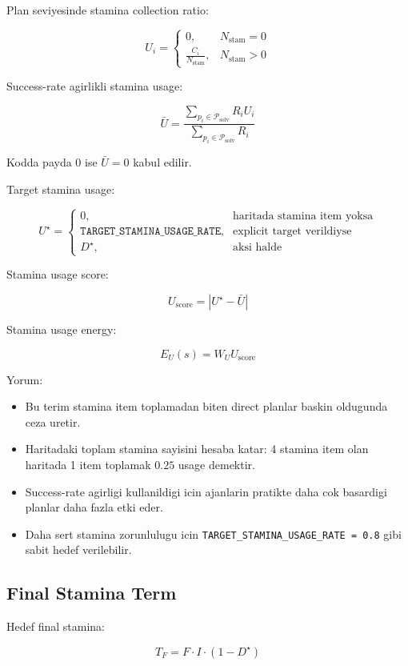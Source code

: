 \documentclass[11pt]{article}
\begin{document}
Plan seviyesinde stamina collection ratio:

\[
U_i
=
\begin{cases}
0, & N_{\text{stam}} = 0 \\
\frac{C_i}{N_{\text{stam}}}, & N_{\text{stam}} > 0
\end{cases}
\]

Success-rate agirlikli stamina usage:

\[
\bar{U}
=
\frac{
  \sum_{p_i \in \mathcal{P}_{\text{solv}}}
  R_i U_i
}{
  \sum_{p_i \in \mathcal{P}_{\text{solv}}}
  R_i
}
\]

Kodda payda $0$ ise $\bar{U}=0$ kabul edilir.

Target stamina usage:

\[
U^\star
=
\begin{cases}
0, & \text{haritada stamina item yoksa} \\
\texttt{TARGET\_STAMINA\_USAGE\_RATE}, & \text{explicit target verildiyse} \\
D^\star, & \text{aksi halde}
\end{cases}
\]

Stamina usage score:

\[
U_{\text{score}}
=
\left|
U^\star - \bar{U}
\right|
\]

Stamina usage energy:

\[
E_U(s)
=
W_U U_{\text{score}}
\]

Yorum:

\begin{itemize}
  \item Bu terim stamina item toplamadan biten direct planlar baskin oldugunda ceza uretir.
  \item Haritadaki toplam stamina sayisini hesaba katar: 4 stamina item olan haritada 1 item toplamak $0.25$ usage demektir.
  \item Success-rate agirligi kullanildigi icin ajanlarin pratikte daha cok basardigi planlar daha fazla etki eder.
  \item Daha sert stamina zorunlulugu icin \texttt{TARGET\_STAMINA\_USAGE\_RATE = 0.8} gibi sabit hedef verilebilir.
\end{itemize}

\subsection{Final Stamina Term}

Hedef final stamina:

\[
T_F
=
F \cdot I \cdot (1 - D^\star)
\]
\end{document}
